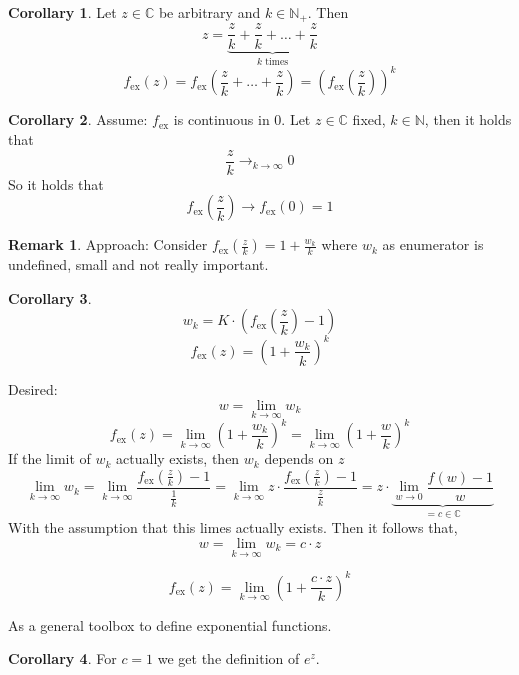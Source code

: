 \documentclass[a4paper,landscape,twocolumn]{article}
\theoremstyle{definition}
\newtheorem{rem}{Remark}
\newtheorem{cor}{Corollary}
\begin{document}
\begin{cor}
  Let $z \in \mathbb C$ be arbitrary and $k \in \mathbb N_+$. Then
  \[ z = \underbrace{\frac zk + \frac zk + \ldots + \frac zk}_{k \text{ times}} \]
  \[
    f_{\text{ex}}(z)
      = f_{\text{ex}}\left(\frac zk + \ldots + \frac zk\right)
      = \left(f_{\text{ex}}\left(\frac zk\right)\right)^k
  \]
\end{cor}

\begin{cor}
  Assume: $f_{\text{ex}}$ is continuous in $0$.
  Let $z \in \mathbb C$ fixed, $k \in \mathbb N$, then it holds that
  \[ \frac zk \to_{k\to\infty} 0 \]
  So it holds that
  \[ f_{\text{ex}}\left(\frac zk\right) \to f_{\text{ex}}(0) = 1 \]
\end{cor}

\begin{rem}
  Approach: Consider $f_{\text{ex}}(\frac zk) = 1 + \frac{w_k}k$
  where $w_k$ as enumerator is undefined, small and not really important.
\end{rem}

\begin{cor}
  \[ w_k = K \cdot \left(f_{\text{ex}}\left(\frac zk\right) - 1\right) \]
  \[ f_{\text{ex}}(z) = \left(1 + \frac{w_k}{k}\right)^k \]

  Desired:
  \[ w = \lim_{k\to\infty} w_k \]
  \[
    f_{\text{ex}}(z)
    = \lim_{k\to\infty} \left(1 + \frac{w_k}{k}\right)^k
    = \lim_{k\to\infty} \left(1 + \frac wk\right)^k
  \]
  If the limit of $w_k$ actually exists, then $w_k$ depends on $z$
  \[
    \lim_{k\to\infty} w_k
    = \lim_{k\to\infty} \frac{f_{\text{ex}}\left(\frac zk\right) - 1}{\frac1k}
    = \lim_{k\to\infty} z \cdot \frac{f_{\text{ex}}\left(\frac zk\right) - 1}{\frac zk}
    = z \cdot \underbrace{\lim_{w\to 0} \frac{f(w) - 1}{w}}_{= c \in \mathbb C}
  \]
  With the assumption that this limes actually exists.
  Then it follows that,
  \[ w = \lim_{k\to\infty} w_k = c \cdot z \]
  \begin{mdframed}
  \[ f_{\text{ex}}(z) = \lim_{k\to\infty} \left(1 + \frac{c \cdot z}{k}\right)^k \]
  \end{mdframed}
  As a general toolbox to define exponential functions.
\end{cor}
\begin{cor}
  For $c = 1$ we get the definition of $e^z$.
\end{cor}
\end{document}
